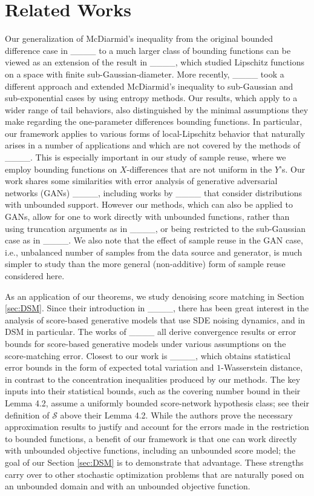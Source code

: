 \section{Related Works}
Our generalization  of McDiarmid's inequality from the original bounded difference case in ____ to a much larger class of bounding functions can be viewed as an extension  of the result in ____, which studied Lipschitz functions on a space with finite sub-Gaussian-diameter.  More recently,  ____  took a different approach and extended  McDiarmid's inequality to sub-Gaussian and sub-exponential cases by using  entropy methods.  Our results, which apply to a wider range of tail behaviors,  also distinguished by the minimal assumptions they make regarding the one-parameter differences bounding functions.  In particular, our framework applies to various forms of local-Lipschitz behavior that naturally arises in a number of applications and which are not covered by   the methods of ____.   This is especially important in our study of sample reuse, where we employ bounding functions on $X$-differences that are not uniform in the $Y$'s.  Our work shares some similarities with  error analysis of generative adversarial networks (GANs) ____, including works by  ____ that consider distributions with unbounded support. However our methods, which can also be applied to GANs,  allow for one to work directly with   unbounded functions, rather than using truncation arguments as in ____,  or being restricted to the  sub-Gaussian  case as in ____.  We also note that the effect of sample reuse in the GAN case, i.e., unbalanced number of samples from the data source and generator, is much simpler to study than the more general (non-additive) form of sample reuse considered here.

As an  application of our theorems, we study denoising score matching  in Section \ref{sec:DSM}. Since their introduction in ____, there has been great interest in the analysis of score-based generative models that use SDE noising dynamics, and in  DSM in particular.   The works of 
____ all derive convergence results or error bounds for score-based generative models under various assumptions on the score-matching error.  Closest to our work is ____, which  obtains statistical error bounds in the form of expected total variation and $1$-Wasserstein distance, in contrast to the concentration inequalities produced by our methods.  The key  inputs into their statistical bounds, such as the covering number bound in their Lemma 4.2, assume a uniformly bounded score-network hypothesis class; see their definition of $\mathcal{S}$ above their Lemma 4.2.  While the authors  prove the  necessary approximation results  to justify and account for the errors made in the restriction to bounded functions, a benefit of our framework is that one can work directly with  unbounded objective functions, including an unbounded score model; the goal of our   Section \ref{sec:DSM} is to demonstrate that advantage.  These strengths carry over to other stochastic optimization problems that are naturally posed on an unbounded domain and with an unbounded objective function.